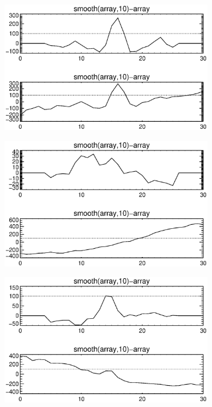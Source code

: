 \documentclass[10pt]{scrartcl}
\begin{document}
\begin{figure}[!ht]
    \begin{subfigure}[b]{.3\linewidth}
        \centering
        \includegraphics[width=1.0\linewidth]{../plots_tables_images/1d1dsums_3_2.eps}
    \end{subfigure}
    \begin{subfigure}[b]{.3\linewidth}
        \centering
        \includegraphics[width=1.0\linewidth]{../plots_tables_images/1d1dsums_4_0.eps}
    \end{subfigure}
    \begin{subfigure}[b]{.3\linewidth}
        \centering
        \includegraphics[width=1.0\linewidth]{../plots_tables_images/1d1dsums_4_9.eps}
    \end{subfigure}
\vspace{0.2in}


\end{figure}
\end{document}
